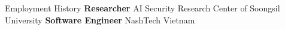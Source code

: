 \begin{rubric}{Employment History}
%
%
%
	\textbf{Researcher} AI Security Research Center of Soongsil University 
%
\entry*[2022 -- 2023]%
	\textbf{Software Engineer} NashTech Vietnam
\end{rubric}